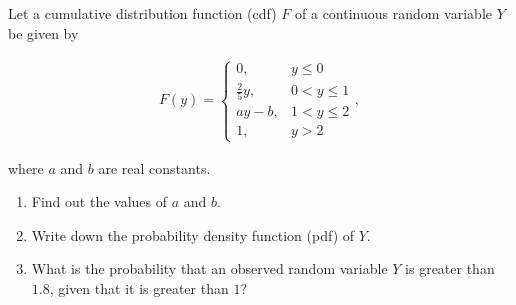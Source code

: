 
\begin{exercise}

Let a cumulative distribution function (cdf) $F$ of a continuous random variable $Y$ be given by

\begin{align*}
    F(y)
    =
    \begin{cases}
        0,             & y \leq 0     \\
        \frac{2}{5} y, & 0 < y \leq 1 \\
        a y - b,       & 1 < y \leq 2 \\
        1,             & y > 2
    \end{cases},
\end{align*}

where $a$ and $b$ are real constants.

\begin{enumerate}[label = (\alph*)]
    \item Find out the values of $a$ and $b$.
    \item Write down the probability density function (pdf) of $Y$.
    \item What is the probability that an observed random variable $Y$ is greater than $1.8$, given that it is greater than $1$?
\end{enumerate}

\end{exercise}


